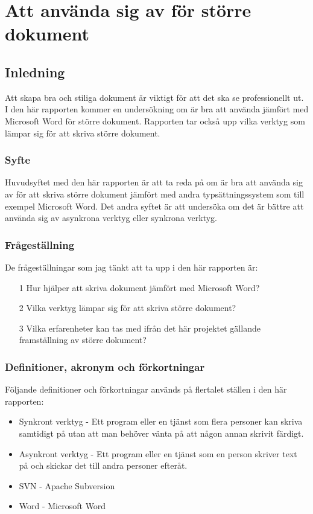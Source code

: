 \chapter{Att använda sig av \latex för större dokument}
\label{cha:indiv-report-tuhkala}

\section{Inledning}
\label{sec:introduction-tuhkala}
Att skapa bra och stiliga dokument är viktigt för att det ska se professionellt ut. I den här rapporten kommer en undersökning om \latex är bra att använda jämfört med Microsoft Word för större dokument. Rapporten tar också upp vilka verktyg som lämpar sig för att skriva större dokument.

\subsection{Syfte}
\label{sec:purpose-tuhkala}
Huvudsyftet med den här rapporten är att ta reda på om \latex är bra att använda sig av för att skriva större dokument jämfört med andra typsättningssystem som till exempel Microsoft Word. Det andra syftet är att undersöka om det är bättre att använda sig av asynkrona verktyg eller synkrona verktyg.

\subsection{Frågeställning}
\label{sec:issue-tuhkala}
De frågeställningar som jag tänkt att ta upp i den här rapporten är:

\begin{itemize}
	\item [1] Hur hjälper \latex att skriva dokument jämfört med Microsoft Word?
	\item [2] Vilka verktyg lämpar sig för att skriva större dokument?
	\item [3] Vilka erfarenheter kan tas med ifrån det här projektet gällande framställning av större dokument?
\end{itemize}

\subsection{Definitioner, akronym och förkortningar}
Följande definitioner och förkortningar används på flertalet ställen i den här rapporten:
\begin{itemize}
	\item Synkront verktyg - Ett program eller en tjänst som flera personer kan skriva samtidigt på utan att man behöver vänta på att någon annan skrivit färdigt.
	\item Asynkront verktyg - Ett program eller en tjänst som en person skriver text på och skickar det till andra personer efteråt.
	\item SVN - Apache Subversion
	\item Word - Microsoft Word
\end{itemize}

